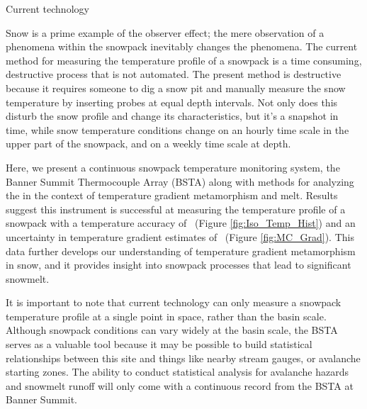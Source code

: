 Current technology 

Snow is a prime example of the observer effect; the mere observation of a phenomena within the snowpack inevitably changes the phenomena. The current method for measuring the temperature profile of a snowpack is a time consuming, destructive process that is not automated. The present method is destructive because it requires someone to dig a snow pit and manually measure the snow temperature by inserting probes at equal depth intervals. Not only does this disturb the snow profile and change its characteristics, but it’s a snapshot in time, while snow temperature conditions change on an hourly time scale in the upper part of the snowpack, and on a weekly time scale at depth.

Here, we present a continuous snowpack temperature monitoring system, the Banner Summit Thermocouple Array (BSTA) along with methods for analyzing the in the context of temperature gradient metamorphism and melt. Results suggest this instrument is successful at measuring the temperature profile of a snowpack with a temperature accuracy of \isostd \ (Figure \ref{fig:Iso_Temp_Hist}) and an uncertainty in temperature gradient estimates of \gradstd \ (Figure \ref{fig:MC_Grad}). This data further develops our understanding of temperature gradient metamorphism in snow, and it provides insight into snowpack processes that lead to significant snowmelt.

It is important to note that current technology can only measure a snowpack temperature profile at a single point in space, rather than the basin scale. Although snowpack conditions can vary widely at the basin scale, the BSTA serves as a valuable tool because it may be possible to build statistical relationships between this site and things like nearby stream gauges, or avalanche starting zones. The ability to conduct statistical analysis for avalanche hazards and snowmelt runoff will only come with a continuous record from the BSTA at Banner Summit.  